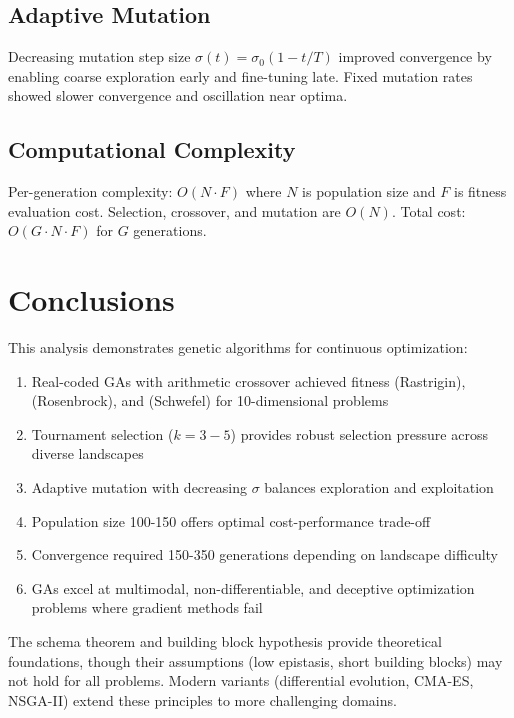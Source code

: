 \documentclass[a4paper, 11pt]{article}
\begin{document}
\subsection{Adaptive Mutation}

Decreasing mutation step size $\sigma(t) = \sigma_0(1 - t/T)$ improved convergence by enabling coarse exploration early and fine-tuning late. Fixed mutation rates showed slower convergence and oscillation near optima.

\subsection{Computational Complexity}

Per-generation complexity: $O(N \cdot F)$ where $N$ is population size and $F$ is fitness evaluation cost. Selection, crossover, and mutation are $O(N)$. Total cost: $O(G \cdot N \cdot F)$ for $G$ generations.

\section{Conclusions}

This analysis demonstrates genetic algorithms for continuous optimization:

\begin{enumerate}
\item Real-coded GAs with arithmetic crossover achieved fitness  (Rastrigin),  (Rosenbrock), and  (Schwefel) for 10-dimensional problems
\item Tournament selection ($k=3-5$) provides robust selection pressure across diverse landscapes
\item Adaptive mutation with decreasing $\sigma$ balances exploration and exploitation
\item Population size 100-150 offers optimal cost-performance trade-off
\item Convergence required 150-350 generations depending on landscape difficulty
\item GAs excel at multimodal, non-differentiable, and deceptive optimization problems where gradient methods fail
\end{enumerate}

The schema theorem and building block hypothesis provide theoretical foundations, though their assumptions (low epistasis, short building blocks) may not hold for all problems. Modern variants (differential evolution, CMA-ES, NSGA-II) extend these principles to more challenging domains.
\end{document}
